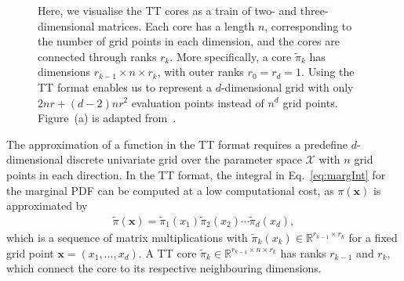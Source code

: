 \begin{figure}[ht!]
	\centering
	\begin{subfigure}{\textwidth}
		
		\caption{}
	\end{subfigure}
	\centering
	\begin{subfigure}{\textwidth}
		\caption{}
	\end{subfigure}
	\caption[Visualisation of a tensor train]{Here, we visualise the TT cores as a train of two- and three-dimensional matrices. 
		Each core has a length $n$, corresponding to the number of grid points in each dimension, and the cores are connected through ranks $r_k$. 
		More specifically, a core $\tilde{\pi}_k$ has dimensions $r_{k-1} \times n \times r_k$, with outer ranks $r_0 = r_d = 1$.
		Using the TT format enables us to represent a $d$-dimensional grid with only $2nr + (d-2)nr^2$ evaluation points instead of $n^d$ grid points.
		Figure~(a) is adapted from~\cite{fox2021grid}.}
	\label{fig:TTfig}
\end{figure}
The approximation of a function in the TT format requires a predefine $d$-dimensional discrete univariate grid over the parameter space $\mathcal{X}$ with $n$ grid points in each direction.
In the TT format, the integral in Eq.~\ref{eq:margInt} for the marginal PDF can be computed at a low computational cost, as $\pi(\bm{x})$ is approximated by
\begin{align*}
	\tilde{\pi}(\bm{x}) = 	\tilde{\pi}_1(x_1)  \tilde{\pi}_2(x_2)  \cdots \tilde{\pi}_d(x_d),
\end{align*}
which is a sequence of matrix multiplications with $\tilde{\pi}_k(x_k) \in \mathbb{R}^{r_{k-1} \times r_k}$ for a fixed grid point $\bm{x} = (x_1, \dots, x_d)$. 
A TT core  $\tilde{\pi}_k \in \mathbb{R}^{r_{k-1} \times n \times r_k}$ has ranks $ r_{k-1}$ and $r_k$, which connect the core to its respective neighbouring dimensions.
